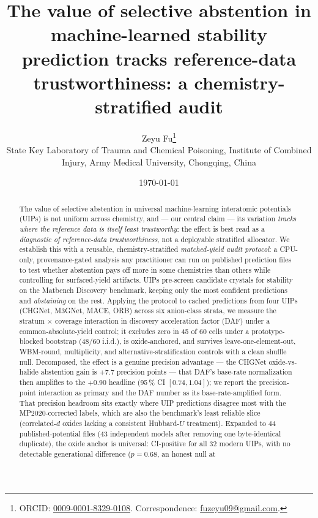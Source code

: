 \documentclass[11pt]{article}
\title{The value of selective abstention in machine-learned stability
prediction tracks reference-data trustworthiness: a chemistry-stratified audit}
\author{Zeyu Fu\thanks{ORCID: \href{https://orcid.org/0009-0001-8329-0108}{0009-0001-8329-0108}.
  Correspondence: \href{mailto:fuzeyu09@gmail.com}{fuzeyu09@gmail.com}.} \\
  \small State Key Laboratory of Trauma and Chemical Poisoning, Institute of Combined Injury,
  Army Medical University, Chongqing, China}
\date{\today}
\begin{document}
\maketitle

\begin{abstract}
\noindent The value of selective abstention in universal machine-learning interatomic potentials
(UIPs) is not uniform across chemistry, and --- our central claim --- its variation
\emph{tracks where the reference data is itself least trustworthy}: the effect is best read as a
\emph{diagnostic of reference-data trustworthiness}, not a deployable stratified allocator. We
establish this with a reusable, chemistry-stratified \emph{matched-yield audit protocol}: a
CPU-only, provenance-gated analysis any practitioner can run on published prediction files to
test whether abstention pays off more in some chemistries than others while controlling for
surfaced-yield artifacts. UIPs pre-screen candidate crystals for stability on the Matbench
Discovery benchmark, keeping only the most confident predictions and \emph{abstaining} on the
rest. Applying the protocol to cached predictions from four UIPs (CHGNet, M3GNet, MACE, ORB)
across six anion-class strata, we measure the stratum $\times$ coverage interaction in discovery
acceleration
factor (DAF) under a common-absolute-yield control; it excludes zero in 45 of 60 cells under a
prototype-blocked bootstrap (48/60 i.i.d.), is oxide-anchored, and survives
leave-one-element-out, WBM-round, multiplicity, and alternative-stratification controls with a
clean shuffle null. Decomposed, the effect is a genuine precision advantage --- the CHGNet
oxide-vs-halide abstention gain is $+7.7$ precision points --- that DAF's base-rate
normalization then amplifies to the $+0.90$ headline (95\,\% CI $[0.74, 1.04]$); we report the
precision-point interaction as primary and the DAF number as its base-rate-amplified form. That
precision headroom sits exactly where UIP predictions disagree most with the MP2020-corrected
labels, which are also the benchmark's least reliable slice (correlated-$d$ oxides lacking a
consistent Hubbard-$U$ treatment).
Expanded to $44$ published-potential files ($43$ independent models after removing one
byte-identical duplicate), the oxide anchor is universal: CI-positive for
all $32$ modern UIPs, with no detectable generational difference ($p{=}0.68$, an honest null at

\end{abstract}
\end{document}

